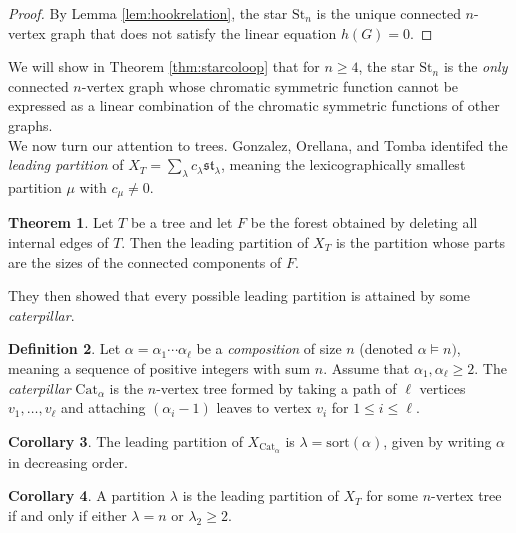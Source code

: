 \documentclass[12pt]{amsart}  %
\theoremstyle{definition}
\newtheorem{theorem}{Theorem}[section]
\newtheorem{corollary}[theorem]{Corollary}
\newtheorem{definition}[theorem]{Definition}
\theoremstyle{remark}
\numberwithin{equation}{section}
\begin{document}
\begin{proof}
By Lemma \ref{lem:hookrelation}, the star $\text{St}_n$ is the unique connected $n$-vertex graph that does not satisfy the linear equation $h(G)=0$.
\end{proof}

We will show in Theorem \ref{thm:starcoloop} that for $n\geq 4$, the star $\text{St}_n$ is the \emph{only} connected $n$-vertex graph whose chromatic symmetric function cannot be expressed as a linear combination of the chromatic symmetric functions of other graphs.\\

We now turn our attention to trees. Gonzalez, Orellana, and Tomba identifed the \emph{leading partition} of $X_T=\sum_\lambda c_\lambda\mathfrak{st}_\lambda$, meaning the lexicographically smallest partition $\mu$ with $c_\mu\neq 0$.

\begin{theorem} \label{thm:leading} \cite[Theorem 4.15]{chromstar}
Let $T$ be a tree and let $F$ be the forest obtained by deleting all internal edges of $T$. Then the leading partition of $X_T$ is the partition whose parts are the sizes of the connected components of $F$.
\end{theorem}

They then showed that every possible leading partition is attained by some \emph{caterpillar}.

\begin{definition}
Let $\alpha=\alpha_1\cdots\alpha_\ell$ be a \emph{composition} of size $n$ (denoted $\alpha\vDash n)$, meaning a sequence of positive integers with sum $n$. Assume that $\alpha_1,\alpha_\ell\geq 2$. The \emph{caterpillar} $\text{Cat}_\alpha$ is the $n$-vertex tree formed by taking a path of $\ell$ vertices $v_1,\ldots,v_\ell$ and attaching $(\alpha_i-1)$ leaves to vertex $v_i$ for $1\leq i\leq\ell$. 
\end{definition}

\begin{corollary}\label{cor:catleading}
The leading partition of $X_{\text{Cat}_\alpha}$ is $\lambda=\text{sort}(\alpha)$, given by writing $\alpha$ in decreasing order.
\end{corollary}

\begin{corollary}
A partition $\lambda$ is the leading partition of $X_T$ for some $n$-vertex tree if and only if either $\lambda=n$ or $\lambda_2\geq 2$.
\end{corollary}
\end{document}
